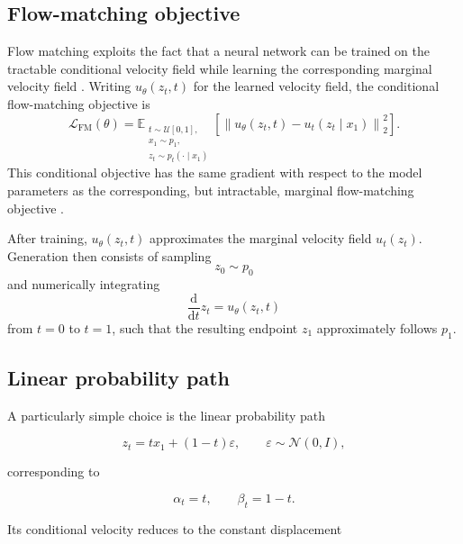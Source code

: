\subsection{Flow-matching objective}

Flow matching exploits the fact that a neural network can be trained on the
tractable conditional velocity field while learning the corresponding
marginal velocity field \parencite{lipman2023flow}.
Writing \(u_\theta(z_t,t)\) for the learned velocity field, the conditional
flow-matching objective is
\begin{equation}
    \mathcal{L}_{\mathrm{FM}}(\theta)
    =
    \mathbb{E}_{
        \substack{
            t\sim\mathcal{U}[0,1],\\
            x_1\sim p_1,\\
            z_t\sim p_t(\cdot\mid x_1)
        }
    }
    \left[
        \left\|
            u_\theta(z_t,t)
            -
            u_t(z_t\mid x_1)
        \right\|_2^2
    \right].
    \label{eq:fm-objective}
\end{equation}
This conditional objective has the same gradient with respect to the model
parameters as the corresponding, but intractable, marginal flow-matching
objective \parencite{lipman2023flow}.

After training, \(u_\theta(z_t,t)\) approximates the marginal velocity field
\(u_t(z_t)\).
Generation then consists of sampling
\[
    z_0\sim p_0
\]
and numerically integrating
\begin{equation}
    \frac{\mathrm{d}}{\mathrm{d}t}z_t
    =
    u_\theta(z_t,t)
\end{equation}
from \(t=0\) to \(t=1\), such that the resulting endpoint
\(z_1\) approximately follows \(p_1\).

\subsection{Linear probability path}

A particularly simple choice is the linear probability path

\begin{equation}
    z_t
    =
    t x_1
    +
    (1-t)\varepsilon,
    \qquad
    \varepsilon\sim\mathcal{N}(0,I),
    \label{eq:linear-probability-path}
\end{equation}

corresponding to

\[
    \alpha_t=t,
    \qquad
    \beta_t=1-t.
\]

Its conditional velocity reduces to the constant displacement

